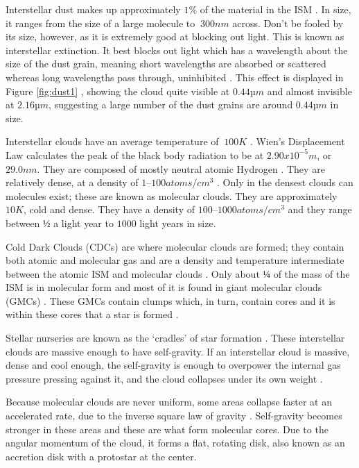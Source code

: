 \documentclass{article}
\begin{document}
Interstellar dust makes up approximately $1\%$ of the material in the ISM \cite{Kay2013}. In size, it ranges from the size of a large molecule to $~300 nm$ across. Don’t be fooled by its size, however, as it is extremely good at blocking out light. This is known as interstellar extinction. It best blocks out light which has a wavelength about the size of the dust grain, meaning short wavelengths are absorbed or scattered whereas long wavelengths pass through, uninhibited \cite{Bergin2007}  . This effect is displayed in Figure \ref{fig:dust1} \cite{Walter1999}, showing the cloud quite visible at $0.44 µm$ and almost invisible at $2.16 µm$, suggesting a large number of the dust grains are around $0.44 µm$ in size. 

Interstellar clouds have an average temperature of $~100 K$ \cite{Kay2013}. Wien’s Displacement Law calculates the peak of the black body radiation to be at $2.90x10^{-5} m$, or $29.0 nm$. They are composed of mostly neutral atomic Hydrogen \cite{Bergin2007}. They are relatively dense, at a density of $1 – 100 atoms/cm^3$ \cite{Kay2013}. Only in the densest clouds can molecules exist; these are known as molecular clouds. They are approximately $10 K$, cold and dense. They have a density of $100 – 1000 atoms/cm^3$ and they range between $½$ a light year to $1000$ light years in size. 

Cold Dark Clouds (CDCs) are where molecular clouds are formed; they contain both atomic and molecular gas and are a density and temperature intermediate between the atomic ISM and molecular clouds \cite{EAOb}. Only about $¼$ of the mass of the ISM is in molecular form and most of it is found in giant molecular clouds (GMCs) \cite{Molinari2010}. These GMCs contain clumps which, in turn, contain cores and it is within these cores that a star is formed \cite{Williams1999}. 

Stellar nurseries are known as the ‘cradles’ of star formation \cite{Kay2013}. These interstellar clouds are massive enough to have self-gravity. If an interstellar cloud is massive, dense and cool enough, the self-gravity is enough to overpower the internal gas pressure pressing against it, and the cloud collapses under its own weight \cite{Jeans1901}.

Because molecular clouds are never uniform, some areas collapse faster at an accelerated rate, due to the inverse square law of gravity \cite{Kay2013}. Self-gravity becomes stronger in these areas and these are what form molecular cores. Due to the angular momentum of the cloud, it forms a flat, rotating disk, also known as an accretion disk with a protostar at the center. 
\end{document}
